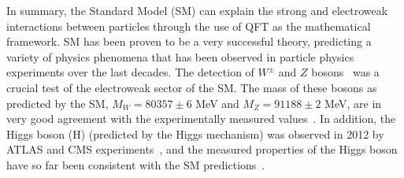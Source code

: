 In summary, the Standard Model (SM) can explain the strong and electroweak interactions between particles through the use of QFT as the mathematical framework.
SM has been proven to be a very successful theory,
predicting a variety of physics phenomena that has been observed in particle physics experiments over the last decades.
The detection of $W^{\pm}$ and $Z$ bosons~\cite{UA1:WBosonDiscovery} was a crucial test of the electroweak sector of the SM.
The mass of these bosons as predicted by the SM, $M_W = 80357 \pm 6$ MeV and $M_Z = 91188 \pm 2$ MeV, 
are in very good agreement with the experimentally measured values~\cite{ATLAS:WMassMeasurement, CMS:ZMassMeasurement}. In addition,
the Higgs boson (H) (predicted by the Higgs mechanism) was observed in 2012 by ATLAS and CMS experiments~\cite{Nisati:2015iwc}, and the 
measured properties of the Higgs boson have so far been consistent with the SM predictions~\cite{CMS:2022dwd}. 


\clearpage
